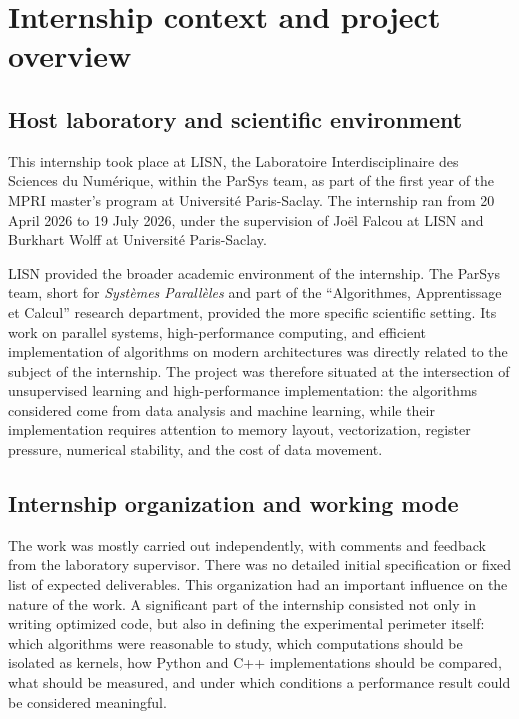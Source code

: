 \documentclass[11pt,a4paper]{article}
\begin{document}
\section{Internship context and project overview}

\subsection{Host laboratory and scientific environment}

This internship took place at LISN, the Laboratoire Interdisciplinaire des Sciences du Numérique, within the ParSys team, as part of the first year of the MPRI master's program at Université Paris-Saclay. The internship ran from 20 April 2026 to 19 July 2026, under the supervision of Joël Falcou at LISN and Burkhart Wolff at Université Paris-Saclay.

LISN provided the broader academic environment of the internship. The ParSys team, short for \emph{Systèmes Parallèles} and part of the ``Algorithmes, Apprentissage et Calcul'' research department, provided the more specific scientific setting. Its work on parallel systems, high-performance computing, and efficient implementation of algorithms on modern architectures was directly related to the subject of the internship. The project was therefore situated at the intersection of unsupervised learning and high-performance implementation: the algorithms considered come from data analysis and machine learning, while their implementation requires attention to memory layout, vectorization, register pressure, numerical stability, and the cost of data movement.

\subsection{Internship organization and working mode}

The work was mostly carried out independently, with comments and feedback from the laboratory supervisor. There was no detailed initial specification or fixed list of expected deliverables. This organization had an important influence on the nature of the work. A significant part of the internship consisted not only in writing optimized code, but also in defining the experimental perimeter itself: which algorithms were reasonable to study, which computations should be isolated as kernels, how Python and C++ implementations should be compared, what should be measured, and under which conditions a performance result could be considered meaningful.
\end{document}
